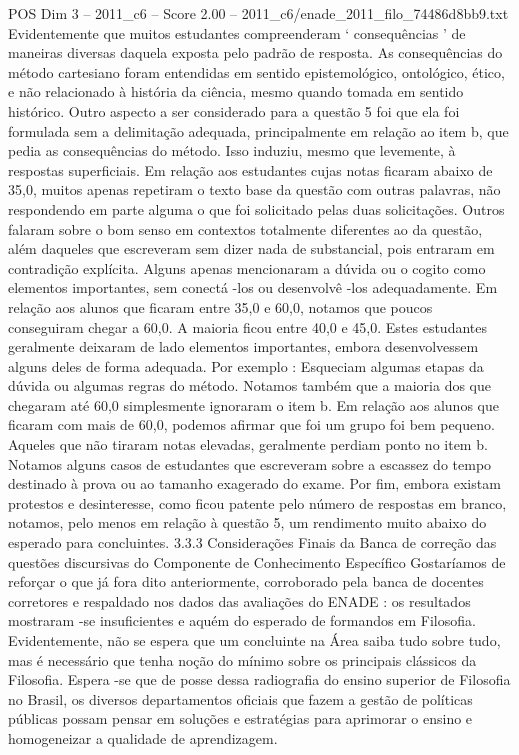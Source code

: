 \begin{textsample}{POS Dim 3 – 2011\_c6 – Score 2.00 – 2011\_c6/enade\_2011\_filo\_74486d8bb9.txt}
Evidentemente que muitos estudantes compreenderam ‘ consequências ’ de maneiras diversas daquela exposta pelo padrão de resposta.
As consequências do método cartesiano foram entendidas em sentido epistemológico, ontológico, ético, e não relacionado à história da ciência, mesmo quando tomada em sentido histórico.
Outro aspecto a ser considerado para a questão 5 foi que ela foi formulada sem a delimitação adequada, principalmente em relação ao item b, que pedia as consequências do método.
Isso induziu, mesmo que levemente, à respostas superficiais.
Em relação aos estudantes cujas notas ficaram abaixo de 35,0, muitos apenas repetiram o texto base da questão com outras palavras, não respondendo em parte alguma o que foi solicitado pelas duas solicitações.
Outros falaram sobre o bom senso em contextos totalmente diferentes ao da questão, além daqueles que escreveram sem dizer nada de substancial, pois entraram em contradição explícita.
Alguns apenas mencionaram a dúvida ou o cogito como elementos importantes, sem conectá -los ou desenvolvê -los adequadamente.
Em relação aos alunos que ficaram entre 35,0 e 60,0, notamos que poucos conseguiram chegar a 60,0.
A maioria ficou entre 40,0 e 45,0.
Estes estudantes geralmente deixaram de lado elementos importantes, embora desenvolvessem alguns deles de forma adequada.
Por exemplo : Esqueciam algumas etapas da dúvida ou algumas regras do método.
Notamos também que a maioria dos que chegaram até 60,0 simplesmente ignoraram o item b.
Em relação aos alunos que ficaram com mais de 60,0, podemos afirmar que foi um grupo foi bem pequeno.
Aqueles que não tiraram notas elevadas, geralmente perdiam ponto no item b.
Notamos alguns casos de estudantes que escreveram sobre a escassez do tempo destinado à prova ou ao tamanho exagerado do exame.
Por fim, embora existam protestos e desinteresse, como ficou patente pelo número de respostas em branco, notamos, pelo menos em relação à questão 5, um rendimento muito abaixo do esperado para concluintes. 3.3.3 Considerações Finais da Banca de correção das questões discursivas do Componente de Conhecimento Específico Gostaríamos de reforçar o que já fora dito anteriormente, corroborado pela banca de docentes corretores e respaldado nos dados das avaliações do ENADE : os resultados mostraram -se insuficientes e aquém do esperado de formandos em Filosofia.
Evidentemente, não se espera que um concluinte na Área saiba tudo sobre tudo, mas é necessário que tenha noção do mínimo sobre os principais clássicos da Filosofia.
Espera -se que de posse dessa radiografia do ensino superior de Filosofia no Brasil, os diversos departamentos oficiais que fazem a gestão de políticas públicas possam pensar em soluções e estratégias para aprimorar o ensino e homogeneizar a qualidade de aprendizagem.

\end{textsample}
